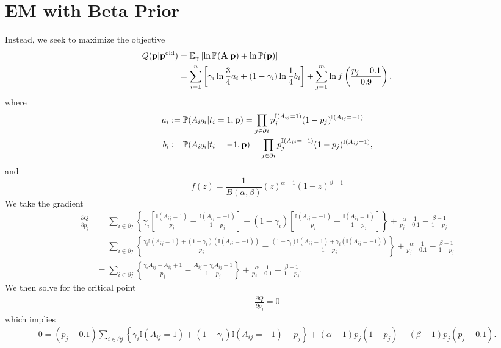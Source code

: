 \documentclass[12pt,onecolumn,letterpaper]{article}
\begin{document}
\section*{EM with Beta Prior}

Instead, we seek to maximize the objective 
\begin{align*}
   Q({\bf p}|{\bf p}^{\rm old})&=\mathbb{E}_{\gamma}\left[\ln\mathbb{P}(\bf{A}|\bf{p})+\ln\mathbb{P({\bf p})}\right]\\
   &=\sum_{i=1}^n \left[\gamma_i\ln{\frac{3}{4}a_i+(1-\gamma_i)\ln\frac{1}{4}b_i}\right]+\sum_{j=1}^m\ln f\left(\frac{p_j-0.1}{0.9}\right),
\end{align*}
where 
\begin{align*}
a_i&:=\mathbb{P}(A_{i\partial i}|t_i=1,{\bf p})=\prod_{j\in\partial i} p_j^{\mathbb{I}(A_{ij}=1)}(1-p_j)^{\mathbb{I}(A_{ij}=-1)}\\
b_i&:=\mathbb{P}(A_{i\partial i}|t_i=-1,{\bf p})=\prod_{j\in\partial i} p_j^{\mathbb{I}(A_{ij}=-1)}(1-p_j)^{\mathbb{I}(A_{ij}=1)},
\end{align*}
and
\begin{equation*}
 f(z)=\frac{1}{B(\alpha,\beta)}(z)^{\alpha-1}(1-z)^{\beta-1}
\end{equation*}
We take the gradient
\begin{align*}
   \frac{\partial{Q}}{\partial{p_j}}&=\sum_{i\in\partial j}\left\{\gamma_i\left[\frac{\mathbb{I}(A_{ij}=1)}{p_j}-\frac{\mathbb{I}(A_{ij}=-1)}{1-p_j}\right]+(1-\gamma_i)\left[\frac{\mathbb{I}(A_{ij}=-1)}{p_j}-\frac{\mathbb{I}(A_{ij}=1)}{1-p_j}\right]\right\}+\frac{\alpha-1}{p_j-0.1}-\frac{\beta-1}{1-p_j}\\
   &=\sum_{i\in\partial j}\left\{\frac{\gamma_i\mathbb{I}(A_{ij}=1)+(1-\gamma_i)(\mathbb{I}(A_{ij}=-1))}{p_j}-\frac{(1-\gamma_i)\mathbb{I}(A_{ij}=1)+\gamma_i(\mathbb{I}(A_{ij}=-1))}{1-p_j}\right\}+\frac{\alpha-1}{p_j-0.1}-\frac{\beta-1}{1-p_j}\\
   &=\sum_{i\in\partial j}\left\{\frac{\gamma_iA_{ij}-A_{ij}+1}{p_j}-\frac{A_{ij}-\gamma_iA_{ij}+1}{1-p_j}\right\}+\frac{\alpha-1}{p_j-0.1}-\frac{\beta-1}{1-p_j}.
\end{align*}
We then solve for the critical point
\begin{align*}
\frac{\partial{Q}}{\partial{p_j}}=0
\end{align*}
which implies
\begin{align*}
  0=(p_j-0.1)\sum_{i\in\partial j}\left\{\gamma_i\mathbb{I}(A_{ij}=1)+(1-\gamma_i)\mathbb{I}(A_{ij}=-1)-p_j\right\}+(\alpha-1)p_j(1-p_j)-(\beta-1)p_j(p_j-0.1).
\end{align*}
\end{document}
